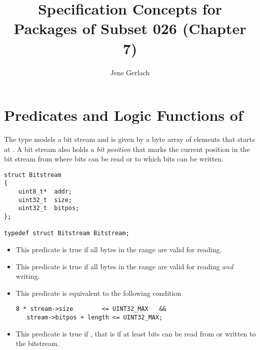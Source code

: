 \documentclass[paper=a4,12pt,DIV16,BCOR8mm,fleqn,twoside]{scrartcl}
\begin{document}
\title{Specification Concepts for Packages of Subset 026 (Chapter 7)}
\author{Jens Gerlach}
\maketitle

\section{Predicates and Logic Functions of }

The type  models a bit stream and is given
by a byte array of  elements that starts at .
A bit stream also holds a \emph{bit position} that marks
the current position in the bit stream from where bits can be
read or to which bits can be written.

\begin{lstlisting}[style = acsl-block]
struct Bitstream
{
    uint8_t*  addr;
    uint32_t  size;
    uint32_t  bitpos;
};

typedef struct Bitstream Bitstream;
\end{lstlisting}

\begin{itemize}
\item
{}

This predicate is true if all bytes in the range
\inl{[stream->addr[0..size-1]} are valid for reading.

\item
{}

This predicate is true if all bytes in the range
\inl{[stream->addr[0..size-1]} are valid for reading \emph{and} writing.

\item
{}

This predicate is equivalent to the following condition

\begin{lstlisting}[style = acsl-block]
   8 * stream->size        <= UINT32_MAX   &&
   stream->bitpos + length <= UINT32_MAX;
\end{lstlisting}

\item
{}

This predicate is true if ,
that is if at least  bits can be read from or written to the
bitstream.

\end{itemize}
\end{document}
